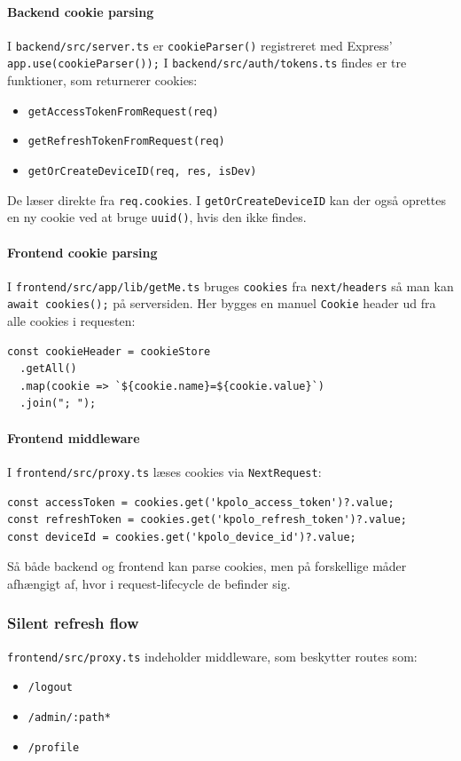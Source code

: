 \paragraph{Backend cookie parsing}
I \texttt{backend/src/server.ts} er \texttt{cookieParser()} registreret med Express' \texttt{app.use(cookieParser());}
I \texttt{backend/src/auth/tokens.ts} findes er tre funktioner, som returnerer cookies:
\begin{itemize}
    \item \texttt{getAccessTokenFromRequest(req)}
    \item \texttt{getRefreshTokenFromRequest(req)}
    \item \texttt{getOrCreateDeviceID(req, res, isDev)}
\end{itemize}
De læser direkte fra \texttt{req.cookies}.
I \texttt{getOrCreateDeviceID} kan der også oprettes en ny cookie ved at bruge \texttt{uuid()}, hvis den ikke findes.
\paragraph{Frontend cookie parsing}
I \texttt{frontend/src/app/lib/getMe.ts} bruges \texttt{cookies} fra \texttt{next/headers} så man kan \texttt{await cookies();}
på serversiden.
Her bygges en manuel \texttt{Cookie} header ud fra alle cookies i requesten:
\begin{verbatim}
const cookieHeader = cookieStore
  .getAll()
  .map(cookie => `${cookie.name}=${cookie.value}`)
  .join("; ");
\end{verbatim}

\paragraph{Frontend middleware}
I \texttt{frontend/src/proxy.ts} læses cookies via \texttt{NextRequest}:
\begin{verbatim}
const accessToken = cookies.get('kpolo_access_token')?.value;
const refreshToken = cookies.get('kpolo_refresh_token')?.value;
const deviceId = cookies.get('kpolo_device_id')?.value;
\end{verbatim}
Så både backend og frontend kan parse cookies, men på forskellige måder afhængigt af, hvor i request-lifecycle de befinder sig.

\subsubsection{Silent refresh flow}
\texttt{frontend/src/proxy.ts} indeholder middleware, som beskytter routes som:
\begin{itemize}
    \item \texttt{/logout}
    \item \texttt{/admin/:path*}
    \item \texttt{/profile}
\end{itemize}

